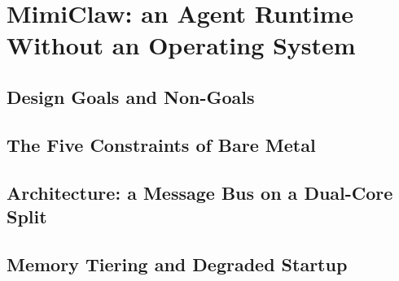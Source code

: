 \chapter{MimiClaw: an Agent Runtime Without an Operating System}
\label{ch:system}

\section{Design Goals and Non-Goals}
\label{sec:sys-goals}

\section{The Five Constraints of Bare Metal}
\label{sec:sys-constraints}

\section{Architecture: a Message Bus on a Dual-Core Split}
\label{sec:sys-architecture}

\section{Memory Tiering and Degraded Startup}
\label{sec:sys-memory}

